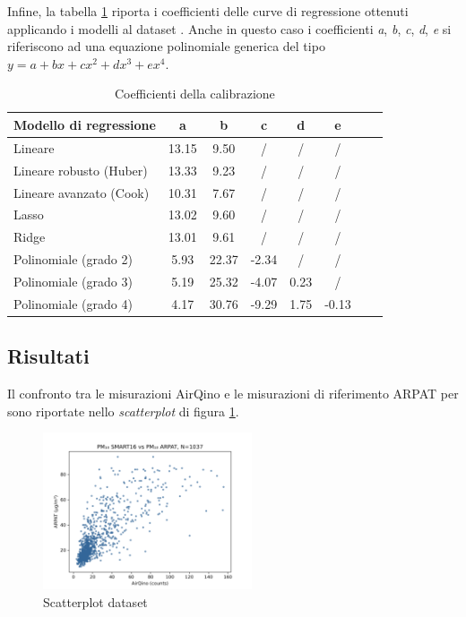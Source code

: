 \clearpage
Infine, la tabella \ref{fig:risultati-pm2.5-coefficienti} riporta i coefficienti delle curve di regressione ottenuti applicando i modelli al dataset . Anche in questo caso i coefficienti \textit{a}, \textit{b}, \textit{c}, \textit{d}, \textit{e} si riferiscono ad una equazione polinomiale generica del tipo $y=a+bx+cx^2+dx^3+ex^4$.

\begin{table}[H]
    \footnotesize
    \centering
    \begin{tabular}{|l|c|c|c|c|c|c|c|}
    \hline
        \textbf{Modello di regressione} & \textbf{a} & \textbf{b} & \textbf{c} & \textbf{d} & \textbf{e} \\ \hline
        Lineare & 13.15 & 9.50 & / & / & / \\ \hline
        Lineare robusto (Huber) & 13.33 & 9.23 & / & / & / \\ \hline
        Lineare avanzato (Cook) & 10.31 & 7.67 & / & / & / \\ \hline
        Lasso & 13.02 & 9.60 & / & / & / \\ \hline
        Ridge & 13.01 & 9.61 & / & / & / \\ \hline
        Polinomiale (grado 2) & 5.93 & 22.37 & -2.34 & / & / \\ \hline
        Polinomiale (grado 3) & 5.19 & 25.32 & -4.07 & 0.23 & / \\ \hline
        Polinomiale (grado 4) & 4.17 & 30.76 & -9.29 & 1.75 & -0.13 \\ \hline
    \end{tabular}
    \caption{Coefficienti della calibrazione }
    \label{fig:risultati-pm2.5-coefficienti}
\end{table}


\subsection{Risultati }\label{ssec:risultati-pm10}

Il confronto tra le misurazioni AirQino e le misurazioni di riferimento ARPAT per  sono riportate nello \textit{scatterplot} di figura \ref{fig:scatterplot_pm10}.

\clearpage

\begin{figure}[H]
\centering
\includegraphics[width=0.55\textwidth,height=\textheight,keepaspectratio]{img/sc_pm10.png}
\caption{Scatterplot dataset }
\label{fig:scatterplot_pm10}
\end{figure}

